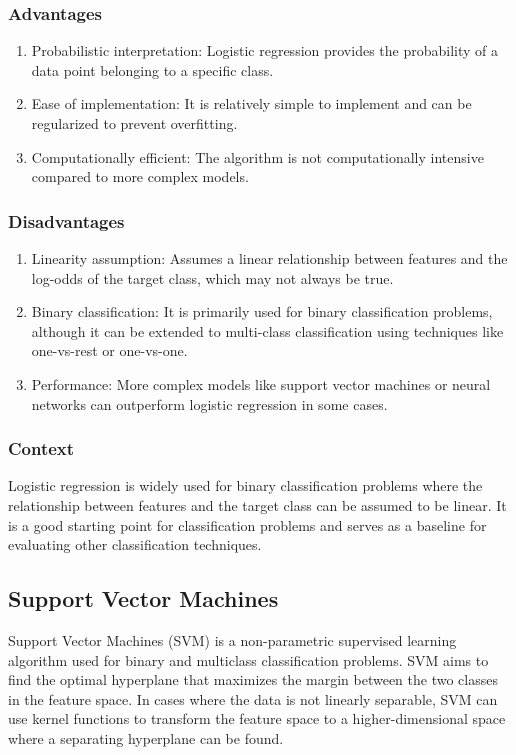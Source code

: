 \documentclass[12pt]{article}
\begin{document}
\subsubsection{Advantages}
\begin{enumerate}
\item Probabilistic interpretation: Logistic regression provides the probability of a data point belonging to a specific class.
\item Ease of implementation: It is relatively simple to implement and can be regularized to prevent overfitting.
\item Computationally efficient: The algorithm is not computationally intensive compared to more complex models.
\end{enumerate}

\subsubsection{Disadvantages}
\begin{enumerate}
\item Linearity assumption: Assumes a linear relationship between features and the log-odds of the target class, which may not always be true.
\item Binary classification: It is primarily used for binary classification problems, although it can be extended to multi-class classification using techniques like one-vs-rest or one-vs-one.
\item Performance: More complex models like support vector machines or neural networks can outperform logistic regression in some cases.
\end{enumerate}

\subsubsection{Context}

Logistic regression is widely used for binary classification problems where the relationship between features and the target class can be assumed to be linear. It is a good starting point for classification problems and serves as a baseline for evaluating other classification techniques.



\subsection{Support Vector Machines}

Support Vector Machines (SVM) is a non-parametric supervised learning algorithm used for binary and multiclass classification problems. SVM aims to find the optimal hyperplane that maximizes the margin between the two classes in the feature space. In cases where the data is not linearly separable, SVM can use kernel functions to transform the feature space to a higher-dimensional space where a separating hyperplane can be found.
\end{document}
